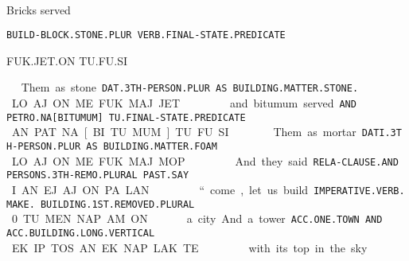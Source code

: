 {\ko\pen~\es\pin\toj
\drie

Bricks 				served 				 

{\tt BUILD-BLOCK.STONE.PLUR          VERB.FINAL-STATE.PREDICATE	 }

FUK.JET.ON			TU.FU.SI			 

\fuk\jet\on ~ \tu\fu\si
\drie

Them			as 	stone	 

{\tt DAT.3TH-PERSON.PLUR AS	BUILDING.MATTER.STONE. }

LO.AJ.ON		ME	FUK.MAJ.JET 

\lo\aj\on ~ \me ~\fuk\maj\jet
\drie
  

and	bitumum 		served  

{\tt AND	PETRO.NA[BITUMUM]	TU.FINAL-STATE.PREDICATE }

AN	PAT.NA[BI.TU.MUM]	TU.FU.SI 

\an ~ \pat\na\cartouche{\Atlanpi\tu\mum} ~ \tu\fu\si
\drie


  

Them				as 	mortar 

{\tt DATI.3TH-PERSON.PLUR               AS	BUILDING.MATTER.FOAM }

LO.AJ.ON			ME	FUK.MAJ.MOP 

\lo\aj\on ~\me ~\fuk\maj\mop
\drie
  

And 			they 				said  

{\tt RELA-CLAUSE.AND          PERSONS.3TH-REMO.PLURAL 	PAST.SAY }

I.AN			EJ.AJ.ON			PA.LAN 

\Atlani\an ~ \ej\aj\on ~ \pa\lan
\drie

  

“come, let us build                                                                          

{\tt IMPERATIVE.VERB.MAKE. BUILDING.1ST.REMOVED.PLURAL	 }

0.TU.MEN.NAP.AM.ON                                                                              
\Atlano\tu\men\nap\am\on

 

a city			And 	a tower	 

{\tt ACC.ONE.TOWN		AND	ACC.BUILDING.LONG.VERTICAL }

EK.IP.TOS		AN	EK.NAP.LAK.TE	 

\Atlani\an ~ \ej\aj\on ~ \pa\lan
\drie

 

with its top 				in           the sky 

}
